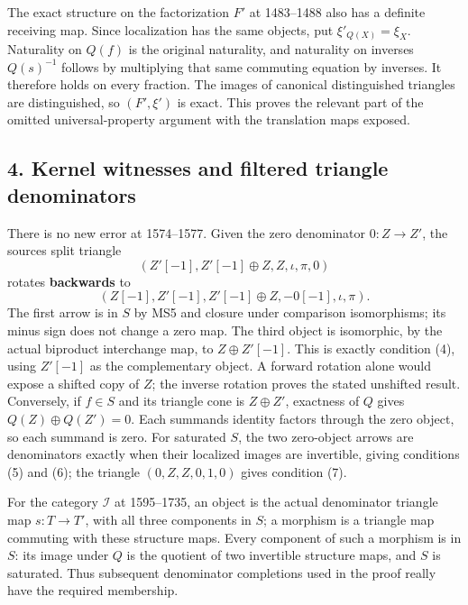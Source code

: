 The exact structure on the factorization \(F'\) at 1483–\allowbreak{}1488 also has a definite receiving map. Since localization has the same objects,\allowbreak{} put \(\xi'_{Q(X)}=\xi_X\). Naturality on \(Q(f)\) is the original naturality,\allowbreak{} and naturality on inverses \(Q(s)^{-1}\) follows by multiplying that same commuting equation by inverses. It therefore holds on every fraction. The images of canonical distinguished triangles are distinguished,\allowbreak{} so \((F',\xi')\) is exact. This proves the relevant part of the omitted universal-property argument with the translation maps exposed.

\subsection{4. Kernel witnesses and filtered triangle denominators}\label{proofs-1149-1843-kernel-witnesses-and-filtered-triangle-denominators}

There is no new error at 1574–\allowbreak{}1577. Given the zero denominator \(0:Z\to Z'\),\allowbreak{} the source\textquotesingle s split triangle \[
(Z'[-1],Z'[-1]\oplus Z,Z,\iota,\pi,0)
\] rotates \textbf{backwards} to \[
(Z[-1],Z'[-1],Z'[-1]\oplus Z,-0[-1],\iota,\pi).
\] The first arrow is in \(S\) by MS5 and closure under comparison isomorphisms; its minus sign does not change a zero map. The third object is isomorphic,\allowbreak{} by the actual biproduct interchange map,\allowbreak{} to \(Z\oplus Z'[-1]\). This is exactly condition (4)\allowbreak{},\allowbreak{} using \(Z'[-1]\) as the complementary object. A forward rotation alone would expose a shifted copy of \(Z\); the inverse rotation proves the stated unshifted result. Conversely,\allowbreak{} if \(f\in S\) and its triangle cone is \(Z\oplus Z'\),\allowbreak{} exactness of \(Q\) gives \(Q(Z)\oplus Q(Z')=0\). Each summand\textquotesingle s identity factors through the zero object,\allowbreak{} so each summand is zero. For saturated \(S\),\allowbreak{} the two zero-object arrows are denominators exactly when their localized images are invertible,\allowbreak{} giving conditions (5)\allowbreak{} and (6)\allowbreak{}; the triangle \((0,Z,Z,0,1,0)\) gives condition (7)\allowbreak{}.

For the category \(\mathcal I\) at 1595–\allowbreak{}1735,\allowbreak{} an object is the actual denominator triangle map \(s:T\to T'\),\allowbreak{} with all three components in \(S\); a morphism is a triangle map commuting with these structure maps. Every component of such a morphism is in \(S\):\allowbreak{} its image under \(Q\) is the quotient of two invertible structure maps,\allowbreak{} and \(S\) is saturated. Thus subsequent denominator completions used in the proof really have the required membership.

